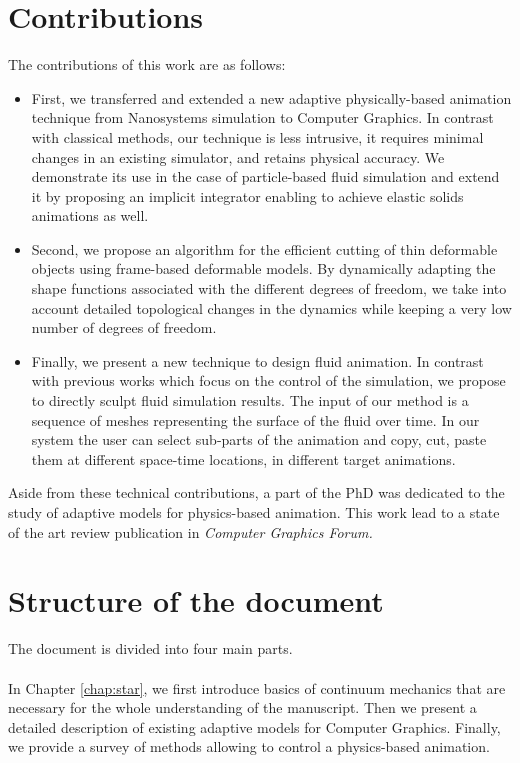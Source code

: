 \section{Contributions}
The contributions of this work are as follows:
\begin{itemize}
    \item First, we transferred and extended a new adaptive physically-based animation technique from Nanosystems simulation to Computer Graphics. In contrast with classical methods, our technique is less intrusive, it requires minimal changes in an existing simulator, and retains physical accuracy. We demonstrate its use in the case of particle-based fluid simulation and extend it by proposing an implicit integrator enabling to achieve elastic solids animations as well.
    \item Second, we propose an algorithm for the efficient cutting of thin deformable objects using frame-based deformable models. By dynamically adapting the shape functions associated with the different degrees of freedom, we take into account detailed topological changes in the dynamics while keeping a very low number of degrees of freedom.
    \item Finally, we present a new technique to design fluid animation. In contrast with previous works which focus on the control of the simulation, we propose to directly sculpt fluid simulation results. The input of our method is a sequence of meshes representing the surface of the fluid over time. In our system the user can select sub-parts of the animation and copy, cut, paste them at different space-time locations, in different target animations.
\end{itemize}
Aside from these technical contributions, a part of the PhD was dedicated to the study of adaptive models for physics-based animation. This work lead to a state of the art review publication in \emph{Computer Graphics Forum.}

\section{Structure of the document}
The document is divided into four main parts.
\paragraph*{}
In Chapter \ref{chap:star}, we first introduce basics of continuum mechanics that are necessary for the whole understanding of the manuscript. Then we present a detailed description of existing adaptive models for Computer Graphics. Finally, we provide a survey of methods allowing to control a physics-based animation.
